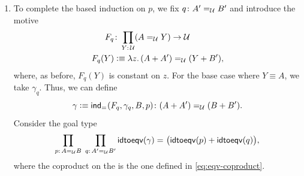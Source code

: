 \begin{solution}
\begin{enumerate}[a),font=\upshape]
\begin{enumerate}
\begin{enumerate}[-]
                \item To complete the based induction on $p$, we fix $q\colon A'\eq{\univ}B'$ and introduce the motive
                \begin{align*}
                    F_q&\colon\prod_{Y\colon\univ}
                        (A\eq{\univ}Y)\to\univ\\
                    F_q(Y)&\defeq\lambda z.\,
                        (A+A')
                        \eq{\univ}(Y+B'),
                \end{align*}
                where, as before, $F_q(Y)$ is constant on $z$. For the base case where $Y\equiv A$, we take $\gamma_q$. Thus, we can define
                \[
                    \gamma\defeq\fun{ind}_{\eq{}}(F_q,\gamma_q,B,p)
                        \colon(A+A')\eq{\univ}(B+B').
                \]
                Consider the goal type
                \begin{align*}
                    \prod_{p\colon A\eq\univ B}\;
                    \prod_{q\colon A'\eq\univ B'}
                        \fun{idtoeqv}(\gamma)
                        \eq{}
                        \bigl(
                            \fun{idtoeqv}(p)+\fun{idtoeqv}(q)
                        \bigr),
                \end{align*}
                where the coproduct on the \rhs is the one defined in \eqref{eq:eqv-coproduct}.
            

\end{enumerate}
\end{enumerate}
\end{enumerate}
\end{solution}
